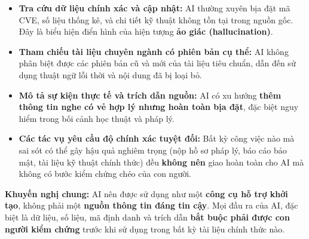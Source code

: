 \begin{itemize}
    \item \textbf{Tra cứu dữ liệu chính xác và cập nhật:} AI thường xuyên bịa đặt mã CVE, số liệu thống kê, và chi tiết kỹ thuật không tồn tại trong nguồn gốc. Đây là biểu hiện điển hình của hiện tượng \textbf{ảo giác (hallucination)}.
    \item \textbf{Tham chiếu tài liệu chuyên ngành có phiên bản cụ thể:} AI không phân biệt được các phiên bản cũ và mới của tài liệu tiêu chuẩn, dẫn đến sử dụng thuật ngữ lỗi thời và nội dung đã bị loại bỏ.
    \item \textbf{Mô tả sự kiện thực tế và trích dẫn nguồn:} AI có xu hướng \textbf{thêm thông tin nghe có vẻ hợp lý nhưng hoàn toàn bịa đặt}, đặc biệt nguy hiểm trong bối cảnh học thuật và pháp lý.
    \item \textbf{Các tác vụ yêu cầu độ chính xác tuyệt đối:} Bất kỳ công việc nào mà sai sót có thể gây hậu quả nghiêm trọng (nộp hồ sơ pháp lý, báo cáo bảo mật, tài liệu kỹ thuật chính thức) đều \textbf{không nên} giao hoàn toàn cho AI mà không có bước kiểm chứng chéo của con người.
\end{itemize}

\vspace{0.3cm}

\textbf{Khuyến nghị chung:} AI nên được sử dụng như một \textbf{công cụ hỗ trợ khởi tạo}, không phải một \textbf{nguồn thông tin đáng tin cậy}. Mọi đầu ra của AI, đặc biệt là dữ liệu, số liệu, mã định danh và trích dẫn \textbf{bắt buộc phải được con người kiểm chứng} trước khi sử dụng trong bất kỳ tài liệu chính thức nào.